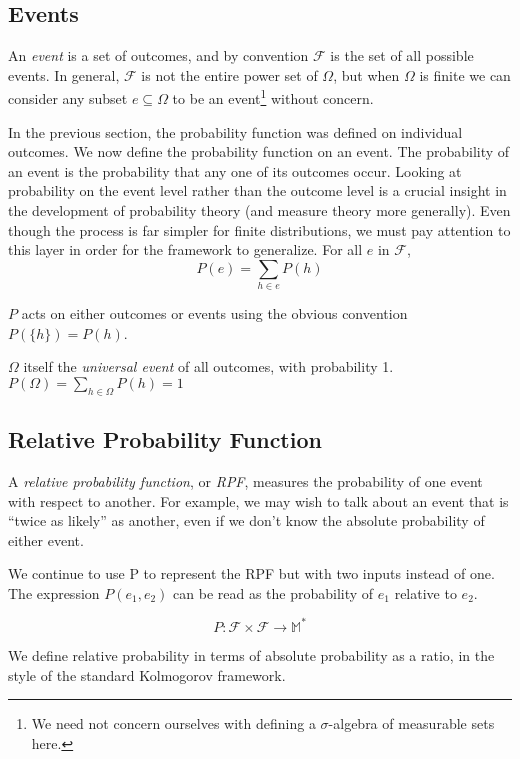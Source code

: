 \documentclass[twoside]{article}
\newcommand{\quotes}[1]{``#1''}
\theoremstyle{plain}%
\theoremstyle{definition}
\theoremstyle{remark}
\begin{document}
\subsection{Events}

An \textit{event} is a set of outcomes, and by convention \(\mathcal{F}\) is the set of all possible events. In general, \(\mathcal{F}\) is not the entire power set of \(\Omega\), but when \(\Omega\) is finite we can consider any subset \(e \subseteq \Omega\) to be an event\footnote{We need not concern ourselves with defining a \(\sigma\)-algebra of measurable sets here.} without concern.

In the previous section, the probability function was defined on individual outcomes. We now define the probability function on an event. The probability of an event is  the probability that any one of its outcomes occur. Looking at probability on the event level rather than the outcome level is a crucial insight in the development of probability theory (and measure theory more generally). Even though the process is far simpler for finite distributions, we must pay attention to this layer in order for the framework to generalize. For all \(e\) in \(\mathcal{F}\),
\[ P(e) = \sum_{h \in e}{P(h)}\]

\(P\) acts on either outcomes or events using the obvious convention \(P(\{h\}) = P(h)\).

\(\Omega\) itself the \textit{universal event} of all outcomes, with probability 1. \(P(\Omega) = \sum_{h \in \Omega}{P(h)} = 1\)

\subsection{Relative Probability Function}
\label{section:standard_relative_prob}

A \textit{relative probability function}, or \textit{RPF}, measures the probability of one event with respect to another. For example, we may wish to talk about an event that is \quotes{twice as likely} as another, even if we don't know the absolute probability of either event.

We continue to use P to represent the RPF but with two inputs instead of one. The expression \(P(e_1, e_2)\) can be read as the probability of \(e_1\) relative to \(e_2\).

\[P: \mathcal{F} \times \mathcal{F} \rightarrow \mathbb{M}^*\]

We define relative probability in terms of absolute probability as a ratio, in the style of the standard Kolmogorov framework.
\end{document}
